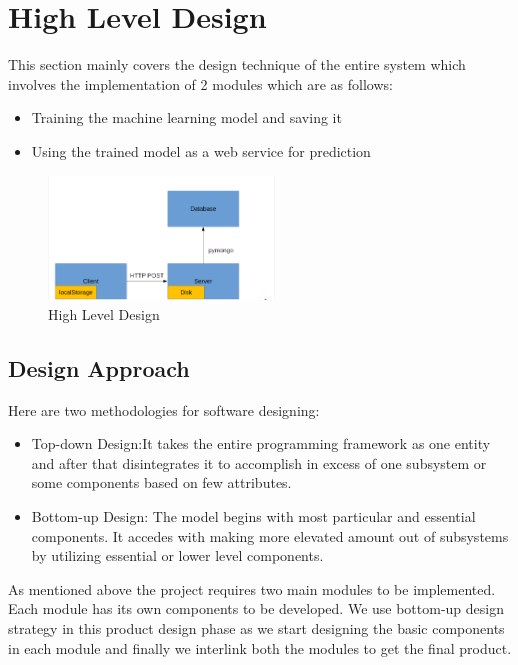 \documentclass[12pt,a4paper,oneside]{report}
\begin{document}
\chapter{High Level Design}
This section mainly covers the design technique of the entire system which involves the implementation of 2 modules which are as follows:
\begin{itemize}
\item Training the machine learning model and saving it
\item Using the trained model as a web service for prediction
\end{itemize}
\begin{figure}[h!]
\centering
  \includegraphics[width=60mm,scale=0.6]{HLD.png}
  \caption{High Level Design}
  \label{fig:HLDD}
\end{figure}
\section{Design Approach}
Here are two methodologies for software designing: 
\begin{itemize}
\item Top-down Design:It takes the entire programming framework as one entity and after that disintegrates it to accomplish in excess of one subsystem or some components based on few attributes.
\item Bottom-up Design: The model begins with most particular and essential components. It accedes with making more elevated amount out of subsystems by utilizing essential or lower level 
components.
\end{itemize}
As mentioned above the project requires two main modules to be implemented. Each module has its own components to be developed. We use bottom-up design strategy in this product design phase as we start designing the basic components in each module and finally we interlink both the modules to get the final product.
\end{document}
